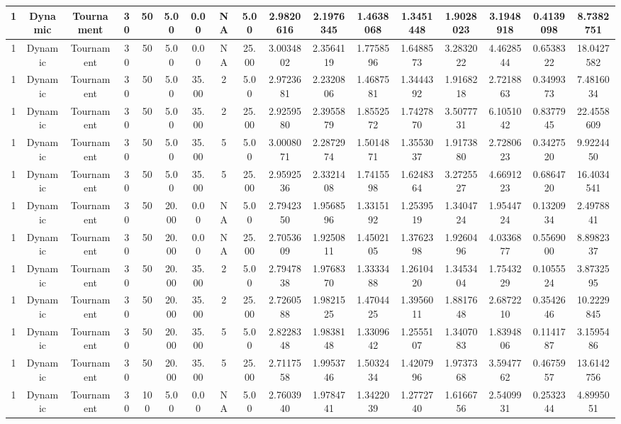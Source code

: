 \documentclass[a4paper]{article}
\begin{document}
\begin{center}
\begin{tabular}{ | c | c | c | c | c | c | c | c | c | c | c | c | c | c | c | c | c | }
		\hline
		1	&	Dynamic	&	Tournament	&	30	&	50	&	5.00	&	0.00	&	NA	&	5.00	&	2.9820616	&	2.1976345	&	1.4638068	&	1.3451448	&	1.9028023	&	3.1948918	&	0.4139098	&	8.7382751 \\
		\hline
		1	&	Dynamic	&	Tournament	&	30	&	50	&	5.00	&	0.00	&	NA	&	25.00	&	3.0034802	&	2.3564119	&	1.7758596	&	1.6488573	&	3.2832022	&	4.4628544	&	0.6538322	&	18.0427582 \\
		\hline
		1	&	Dynamic	&	Tournament	&	30	&	50	&	5.00	&	35.00	&	2	&	5.00	&	2.9723681	&	2.2320806	&	1.4687581	&	1.3444392	&	1.9168218	&	2.7218863	&	0.3499373	&	7.4816034 \\
		\hline
		1	&	Dynamic	&	Tournament	&	30	&	50	&	5.00	&	35.00	&	2	&	25.00	&	2.9259580	&	2.3955879	&	1.8552572	&	1.7427870	&	3.5077731	&	6.1051042	&	0.8377945	&	22.4558609 \\
		\hline
		1	&	Dynamic	&	Tournament	&	30	&	50	&	5.00	&	35.00	&	5	&	5.00	&	3.0008071	&	2.2872974	&	1.5014871	&	1.3553037	&	1.9173880	&	2.7280623	&	0.3427520	&	9.9224450 \\
		\hline
		1	&	Dynamic	&	Tournament	&	30	&	50	&	5.00	&	35.00	&	5	&	25.00	&	2.9592536	&	2.3321408	&	1.7415598	&	1.6248364	&	3.2725527	&	4.6691223	&	0.6864720	&	16.4034541 \\
		\hline
		1	&	Dynamic	&	Tournament	&	30	&	50	&	20.00	&	0.00	&	NA	&	5.00	&	2.7942350	&	1.9568596	&	1.3315192	&	1.2539519	&	1.3404724	&	1.9544724	&	0.1320934	&	2.4978841 \\
		\hline
		1	&	Dynamic	&	Tournament	&	30	&	50	&	20.00	&	0.00	&	NA	&	25.00	&	2.7053609	&	1.9250811	&	1.4502105	&	1.3762398	&	1.9260496	&	4.0336877	&	0.5569000	&	8.8982337 \\
		\hline
		1	&	Dynamic	&	Tournament	&	30	&	50	&	20.00	&	35.00	&	2	&	5.00	&	2.7947838	&	1.9768370	&	1.3333488	&	1.2610420	&	1.3453404	&	1.7543229	&	0.1055524	&	3.8732595 \\
		\hline
		1	&	Dynamic	&	Tournament	&	30	&	50	&	20.00	&	35.00	&	2	&	25.00	&	2.7260588	&	1.9821525	&	1.4704425	&	1.3956011	&	1.8817648	&	2.6872210	&	0.3542646	&	10.2229845 \\
		\hline
		1	&	Dynamic	&	Tournament	&	30	&	50	&	20.00	&	35.00	&	5	&	5.00	&	2.8228348	&	1.9838148	&	1.3309642	&	1.2555107	&	1.3407083	&	1.8394806	&	0.1141787	&	3.1595486 \\
		\hline
		1	&	Dynamic	&	Tournament	&	30	&	50	&	20.00	&	35.00	&	5	&	25.00	&	2.7117558	&	1.9953746	&	1.5032434	&	1.4207996	&	1.9737368	&	3.5947762	&	0.4675957	&	13.6142756 \\
		\hline
		1	&	Dynamic	&	Tournament	&	30	&	100	&	5.00	&	0.00	&	NA	&	5.00	&	2.7603940	&	1.9784741	&	1.3422039	&	1.2772740	&	1.6166756	&	2.5409931	&	0.2532344	&	4.8995051 \\

\end{tabular}
\end{center}
\end{document}
